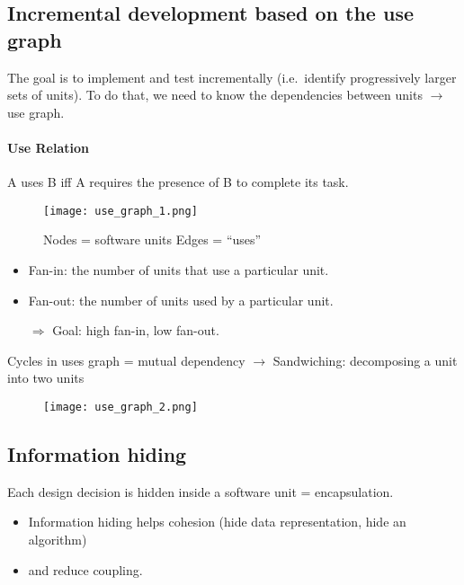 \subsection{Incremental development based on the use graph}

The goal is to implement and test incrementally (i.e.\ identify progressively larger sets of
units). To do that, we need to know the dependencies between units $\rightarrow$ use graph.

\paragraph{Use Relation} A uses B iff A requires the presence of B to complete its task.

 
\begin{figure}[!ht]
    \begin{minipage}{\linewidth}
        \begin{minipage}{0.45\linewidth}
            \texttt{[image: use\_graph\_1.png]}
        \end{minipage}
        \begin{minipage}{0.45\linewidth}
            Nodes = software units \newline
            Edges = \enquote{uses}
        \end{minipage}
    \end{minipage}
\end{figure}

\begin{itemize}
\item Fan-in: the number of units that use a particular unit. 
\item Fan-out: the number of units used by a particular unit. 
\item[$\Rightarrow$] Goal: high fan-in, low fan-out.
\end{itemize}

Cycles in uses graph = mutual dependency $\rightarrow$ Sandwiching: decomposing a unit into two units

\begin{figure}[!ht]
    \centering
    \texttt{[image: use\_graph\_2.png]}
\end{figure}

\subsection{Information hiding}

Each design decision is hidden inside a software unit = encapsulation.
\begin{itemize}
    \item Information hiding helps cohesion (hide data representation, hide an algorithm)
    \item and reduce coupling.
\end{itemize}

